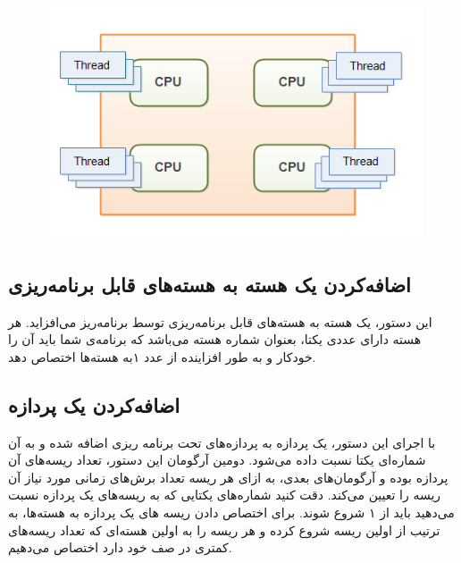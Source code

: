 \documentclass{utap}
\begin{document}
	\begin{figure}[H]
		\centering
		\includegraphics[width=0.5 \textwidth]{ThreadsOnCore.png}     
	\end{figure}
	
	
	\subsection{اضافه‌کردن یک هسته به هسته‌های قابل برنامه‌ریزی}
	\hspace{5mm}
	این دستور، یک هسته به هسته‌های قابل برنامه‌ریزی توسط برنامه‌ریز می‌افزاید. هر هسته دارای عددی یکتا، بعنوان شماره هسته می‌باشد که برنامه‌ی شما باید آن را خودکار و به طور افزاینده از عدد ۱به هسته‌ها اختصاص دهد.

	 \linespread{1.6}
	\begin{latin}%
		\centering
		\begin{minipage}[t]{1\textwidth}
			{}
			{}
		\end{minipage}%
	\end{latin}
	
	\subsection{اضافه‌کردن یک پردازه}
	\hspace{5mm}
	با اجرای این دستور، یک پردازه به پردازه‌های تحت برنامه ریزی اضافه‌ شده و به آن شماره‌ا‌‌ی یکتا نسبت داده می‌شود. دومین آرگومان این دستور، تعداد ریسه‌های آن پردازه بوده و آرگومان‌‌های بعدی، به ازای هر ریسه تعداد برش‌های زمانی مورد نیاز آن ریسه را تعیین می‌کند. دقت کنید شماره‌‌ها‌ی یکتایی که به ریسه‌های یک پردازه نسبت می‌دهید باید از ۱ شروع شوند. برای اختصاص دادن ریسه ‌های یک پردازه به هسته‌ها، به ترتیب از اولین ریسه شروع کرده و هر ریسه را به اولین هسته‌ای  که تعداد ریسه‌های کمتری در صف خود دارد اختصاص می‌دهیم.
	
	\linespread{1.6}
	\begin{latin}%
		\centering
		\begin{minipage}[t]{1\textwidth}
			{}
			{}
			{}
		\end{minipage}%
	\end{latin}
\end{document}

